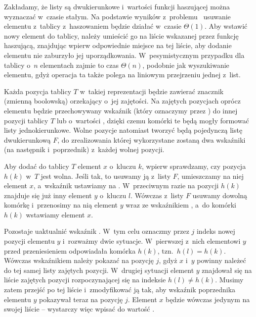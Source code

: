 \exercise %
Zakładamy, że listy są dwukierunkowe i~wartości funkcji haszującej można wyznaczać w~czasie stałym. Na podstawie wyników z~problemu~ usuwanie elementu z~tablicy z~haszowaniem będzie działać w~czasie $\Theta(1)$. Aby wstawić nowy element do tablicy, należy umieścić go na liście wskazanej przez funkcję haszującą, znajdując wpierw odpowiednie miejsce na tej liście, aby dodanie elementu nie zaburzyło jej uporządkowania. W~pesymistycznym przypadku dla tablicy o~$n$ elementach zajmie to czas $\Theta(n)$, podobnie jak wyszukiwanie elementu, gdyż operacja ta także polega na liniowym przejrzeniu jednej z~list.

\exercise %
Każda pozycja tablicy $T$ w~takiej reprezentacji będzie zawierać znacznik (zmienną boolowską) orzekający o~jej zajętości. Na zajętych pozycjach oprócz elementu będzie przechowywany wskaźnik (który oznaczymy przez ) do innej pozycji tablicy $T$ lub o~wartości , dzięki czemu komórki te będą mogły formować listy jednokierunkowe. Wolne pozycje natomiast tworzyć będą pojedynczą listę dwukierunkową $F$, do zrealizowania której wykorzystane zostaną dwa wskaźniki (na następnik i~poprzednik) z~każdej wolnej pozycji.

Aby dodać do tablicy $T$ element $x$ o~kluczu $k$, wpierw sprawdzamy, czy pozycja $h(k)$ w~$T$ jest wolna. Jeśli tak, to usuwamy ją z~listy $F$, umieszczamy na niej element $x$, a~wskaźnik  ustawiamy na . W~przeciwnym razie na pozycji $h(k)$ znajduje się już inny element $y$ o~kluczu $l$. Wówczas z~listy $F$ usuwamy dowolną komórkę i~przenosimy na nią element $y$ wraz ze wskaźnikiem , a~do komórki $h(k)$ wstawiamy element $x$.

Pozostaje uaktualnić wskaźnik . W~tym celu oznaczmy przez $j$ indeks nowej pozycji elementu $y$ i~rozważmy dwie sytuacje. W~pierwszej z~nich elementowi $y$ przed przeniesieniem odpowiadała komórka $h(k)$, tzn.\ $h(l)=h(k)$. Wówczas wskaźnikiem  należy pokazać na pozycję $j$, gdyż $x$ i~$y$ powinny należeć do tej samej listy zajętych pozycji. W~drugiej sytuacji element $y$ znajdował się na liście zajętych pozycji rozpoczynającej się na indeksie $h(l)\ne h(k)$. Musimy zatem przejść po tej liście i~zmodyfikować ją tak, aby wskaźnik  poprzednika elementu $y$ pokazywał teraz na pozycję $j$. Element $x$ będzie wówczas jedynym na swojej liście -- wystarczy więc wpisać do  wartość .

